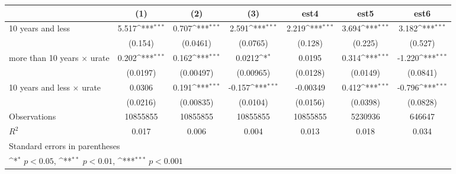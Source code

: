 {
\def\sym#1{\ifmmode^{#1}\else\(^{#1}\)\fi}
\begin{tabular}{l*{6}{c}}
\hline\hline
                                   &\multicolumn{1}{c}{(1)}&\multicolumn{1}{c}{(2)}&\multicolumn{1}{c}{(3)}&\multicolumn{1}{c}{est4}&\multicolumn{1}{c}{est5}&\multicolumn{1}{c}{est6}\\
\hline
10 years and less                  &       5.517\sym{***}&       0.707\sym{***}&       2.591\sym{***}&       2.219\sym{***}&       3.694\sym{***}&       3.182\sym{***}\\
                                   &     (0.154)         &    (0.0461)         &    (0.0765)         &     (0.128)         &     (0.225)         &     (0.527)         \\
[1em]
more than 10 years $\times$ urate  &       0.202\sym{***}&       0.162\sym{***}&      0.0212\sym{*}  &      0.0195         &       0.314\sym{***}&      -1.220\sym{***}\\
                                   &    (0.0197)         &   (0.00497)         &   (0.00965)         &    (0.0128)         &    (0.0149)         &    (0.0841)         \\
[1em]
10 years and less $\times$ urate   &      0.0306         &       0.191\sym{***}&      -0.157\sym{***}&    -0.00349         &       0.412\sym{***}&      -0.796\sym{***}\\
                                   &    (0.0216)         &   (0.00835)         &    (0.0104)         &    (0.0156)         &    (0.0398)         &    (0.0828)         \\
\hline
Observations                       &    10855855         &    10855855         &    10855855         &    10855855         &     5230936         &      646647         \\
\(R^{2}\)                          &       0.017         &       0.006         &       0.004         &       0.013         &       0.018         &       0.034         \\
\hline\hline
\multicolumn{7}{l}{\footnotesize Standard errors in parentheses}\\
\multicolumn{7}{l}{\footnotesize \sym{*} \(p<0.05\), \sym{**} \(p<0.01\), \sym{***} \(p<0.001\)}\\
\end{tabular}
}
